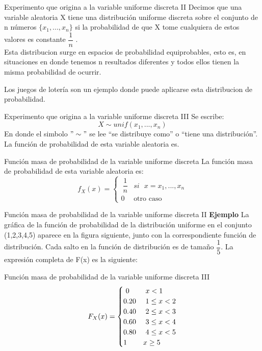 \documentclass[11pt]{beamer}
\begin{document}
\begin{frame}{Experimento que origina a la variable uniforme discreta II}
Decimos que una variable aleatoria X tiene una distribución uniforme discreta sobre el conjunto de n números $\lbrace x_{1},...,x_{n} \rbrace$ si la probabilidad de que X tome cualquiera de estos valores es constante $\dfrac{1}{n}$ . \\
Esta distribucion surge en espacios de probabilidad equiprobables, esto es, en situaciones en donde tenemos n resultados diferentes y todos ellos tienen la misma probabilidad de ocurrir. 

Los juegos de lotería son un ejemplo donde puede aplicarse esta distribucion de probabilidad. 
\end{frame}

\begin{frame}{Experimento que origina a la variable uniforme discreta III}
Se escribe:
$$X \sim unif(x_{1},...,x_{n})$$
En donde el simbolo $"\sim"$ se lee “se distribuye como” o “tiene una distribución”. La función de probabilidad de esta variable aleatoria es.
\end{frame}

\begin{frame}{Función masa de probabilidad de la variable uniforme discreta}
La función masa de probabilidad de esta variable aleatoria es:
$$
f_{X} (x)=\begin{cases}
\ {\dfrac{1}{n}} & si \mbox{ $x=x_{1},...,x_{n}$}\\{0 }& \mbox{otro caso}\
\end{cases}
$$
\end{frame}
\begin{frame}{Función masa de probabilidad de la variable uniforme discreta II}
\textbf{Ejemplo}
La gráfica de la función de probabilidad de la distribución
uniforme en el conjunto (1,2,3,4,5) aparece en la figura siguiente, junto con la correspondiente función de distribución. Cada salto en la función de distribución es de tamaño $\dfrac{1}{5}$. La expresión completa de F(x) es la siguiente:
\end{frame}
\begin{frame}{Función masa de probabilidad de la variable uniforme discreta III}
$$
F_{X} (x)=\begin{cases}
\ {0} &  \mbox{ $x<1$}\\ {0.20} &  \mbox{ $1\leq x<2$}\\ {0.40} &  \mbox{ $2\leq x<3$}\\ {0.60} &  \mbox{ $3\leq x<4$}\\ {0.80} &  \mbox{ $4\leq x<5$}\\ {1} &  \mbox{$ x\geq 5$}\
\end{cases}
$$
\end{frame}
\end{document}
